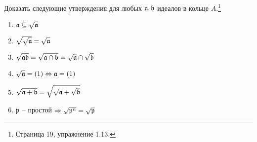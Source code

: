     \begin{Ex}
        Доказать следующие утверждения для любых $\mathfrak{a}, \mathfrak{b}$ идеалов в кольце $A$.\footnote{\cite{A-M} Страница 19, упражнение 1.13.}
        \begin{enumerate}
            \item $\mathfrak{a} \subseteq \sqrt{\mathfrak{a}}$
            \item $\sqrt{\sqrt{\mathfrak{a}}} = \sqrt{\mathfrak{a}}$
            \item $\sqrt{\mathfrak{ab}} = \sqrt{\mathfrak{a} \cap \mathfrak{b}} = \sqrt{\mathfrak{a}} \cap \sqrt{\mathfrak{b}}$
            \item $\sqrt{\mathfrak{a}} = (1) \Leftrightarrow \mathfrak{a} = (1)$
            \item $\sqrt{\mathfrak{a} + \mathfrak{b}} = \sqrt{\sqrt{\mathfrak{a}} + \sqrt{\mathfrak{b}}}$
            \item $\mathfrak{p}$ -- простой $\Rightarrow \sqrt{\mathfrak{p}^n} = \sqrt{\mathfrak{p}}$
        \end{enumerate}
    \end{Ex}

